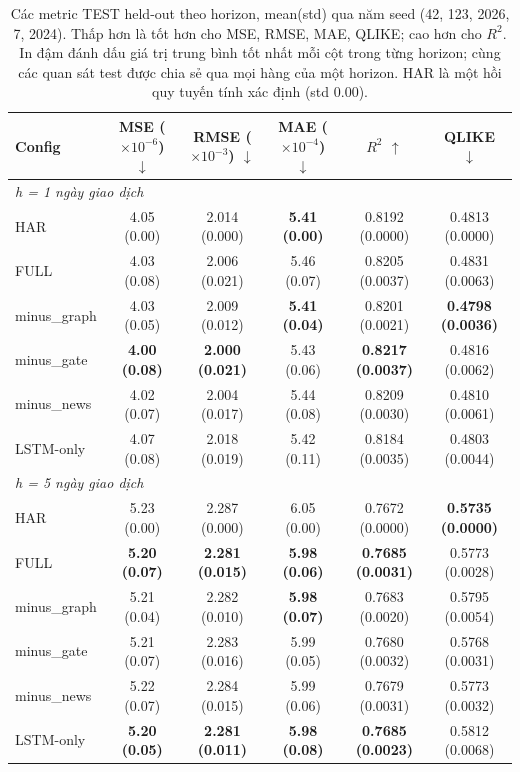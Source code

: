 \documentclass[runningheads]{llncs}
\begin{document}
\begin{table}[t]
\caption{Các metric TEST held-out theo horizon, mean(std) qua năm seed (42, 123, 2026, 7, 2024). Thấp
hơn là tốt hơn cho MSE, RMSE, MAE, QLIKE; cao hơn cho $R^2$. In đậm đánh dấu giá trị trung bình tốt nhất
mỗi cột trong từng horizon; cùng các quan sát test được chia sẻ qua mọi hàng của một horizon. HAR là một
hồi quy tuyến tính xác định (std 0.00).}
\label{tab:metrics}
\centering
\begin{tabular}{lccccc}
\toprule
Config & MSE ($\times10^{-6}$) $\downarrow$ & RMSE ($\times10^{-3}$) $\downarrow$ & MAE ($\times10^{-4}$) $\downarrow$ & $R^2$ $\uparrow$ & QLIKE $\downarrow$ \\
\midrule
\multicolumn{6}{l}{\textit{h = 1 ngày giao dịch}}\\
HAR         & 4.05 (0.00) & 2.014 (0.000) & \textbf{5.41 (0.00)} & 0.8192 (0.0000) & 0.4813 (0.0000) \\
FULL        & 4.03 (0.08) & 2.006 (0.021) & 5.46 (0.07) & 0.8205 (0.0037) & 0.4831 (0.0063) \\
minus\_graph & 4.03 (0.05) & 2.009 (0.012) & \textbf{5.41 (0.04)} & 0.8201 (0.0021) & \textbf{0.4798 (0.0036)} \\
minus\_gate  & \textbf{4.00 (0.08)} & \textbf{2.000 (0.021)} & 5.43 (0.06) & \textbf{0.8217 (0.0037)} & 0.4816 (0.0062) \\
minus\_news  & 4.02 (0.07) & 2.004 (0.017) & 5.44 (0.08) & 0.8209 (0.0030) & 0.4810 (0.0061) \\
LSTM-only   & 4.07 (0.08) & 2.018 (0.019) & 5.42 (0.11) & 0.8184 (0.0035) & 0.4803 (0.0044) \\
\midrule
\multicolumn{6}{l}{\textit{h = 5 ngày giao dịch}}\\
HAR         & 5.23 (0.00) & 2.287 (0.000) & 6.05 (0.00) & 0.7672 (0.0000) & \textbf{0.5735 (0.0000)} \\
FULL        & \textbf{5.20 (0.07)} & \textbf{2.281 (0.015)} & \textbf{5.98 (0.06)} & \textbf{0.7685 (0.0031)} & 0.5773 (0.0028) \\
minus\_graph & 5.21 (0.04) & 2.282 (0.010) & \textbf{5.98 (0.07)} & 0.7683 (0.0020) & 0.5795 (0.0054) \\
minus\_gate  & 5.21 (0.07) & 2.283 (0.016) & 5.99 (0.05) & 0.7680 (0.0032) & 0.5768 (0.0031) \\
minus\_news  & 5.22 (0.07) & 2.284 (0.015) & 5.99 (0.06) & 0.7679 (0.0031) & 0.5773 (0.0032) \\
LSTM-only   & \textbf{5.20 (0.05)} & \textbf{2.281 (0.011)} & \textbf{5.98 (0.08)} & \textbf{0.7685 (0.0023)} & 0.5812 (0.0068) \\

\end{tabular}
\end{table}
\end{document}
